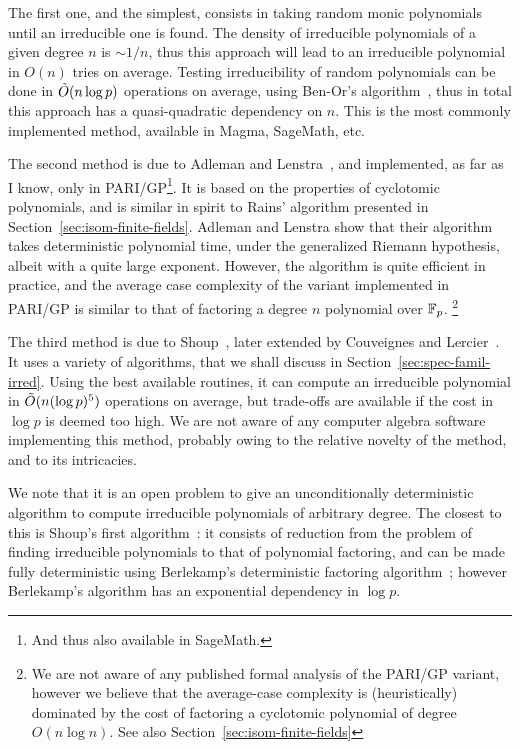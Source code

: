 \documentclass{report}
\theoremstyle{plain}
\theoremstyle{definition}
\begin{document}
The first one, and the simplest, consists in taking random monic
polynomials until an irreducible one is found. %
The density of irreducible polynomials of a given degree $n$ is
$\sim 1/n$, thus this approach will lead to an irreducible polynomial
in $O(n)$ tries on average. %
Testing irreducibility of random polynomials can be done in
$\tilde{O}(n\log p)$ operations on average, using Ben-Or's
algorithm~\cite{Ben-Or1981,10.1007/978-3-642-60539-0_27}, thus in
total this approach has a quasi-quadratic dependency on $n$. %
This is the most commonly implemented method, available in Magma,
SageMath, etc.

The second method is due to Adleman and
Lenstra~\cite{Adleman-Lenstra}, and implemented, as far as I know,
only in PARI/GP\footnote{And thus also available in SageMath.}. %
It is based on the properties of cyclotomic polynomials, and is
similar in spirit to Rains' algorithm presented in
Section~\ref{sec:isom-finite-fields}. %
Adleman and Lenstra show that their algorithm takes deterministic
polynomial time, under the generalized Riemann hypothesis, albeit with
a quite large exponent. %
However, the algorithm is quite efficient in practice, and the average
case complexity of the variant implemented in PARI/GP is similar to
that of factoring a degree $n$ polynomial over $\mathbb{F}_p$.%
\footnote{We are not aware of any published formal analysis of the
  PARI/GP variant, however we believe that the average-case complexity
  is (heuristically) dominated by the cost of factoring a cyclotomic
  polynomial of degree $O(n\log n)$. %
  See also Section~\ref{sec:isom-finite-fields}} %

The third method is due to Shoup~\cite{Shoup_1990,shoup93,shoup94},
later extended by Couveignes and
Lercier~\cite{couveignes+lercier11,DeDoSc13}. %
It uses a variety of algorithms, that we shall discuss in
Section~\ref{sec:spec-famil-irred}. %
Using the best available routines, it can compute an irreducible
polynomial in $\tilde{O}(n(\log p)^5)$ operations on average, but
trade-offs are available if the cost in $\log p$ is deemed too high. %
We are not aware of any computer algebra software implementing this
method, probably owing to the relative novelty of the method, and to
its intricacies. %

We note that it is an open problem to give an unconditionally
deterministic algorithm to compute irreducible polynomials of
arbitrary degree. %
The closest to this is Shoup's first algorithm~\cite{Shoup_1990}: it
consists of reduction from the problem of finding irreducible
polynomials to that of polynomial factoring, and can be made fully
deterministic using Berlekamp's deterministic factoring
algorithm~\cite{berlekamp1970factoring}; however Berlekamp's algorithm
has an exponential dependency in $\log p$.
\end{document}
